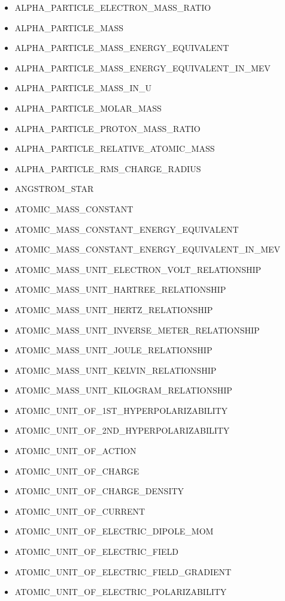 \begin{itemize}
\item
  ALPHA\_PARTICLE\_ELECTRON\_MASS\_RATIO
\item
  ALPHA\_PARTICLE\_MASS
\item
  ALPHA\_PARTICLE\_MASS\_ENERGY\_EQUIVALENT
\item
  ALPHA\_PARTICLE\_MASS\_ENERGY\_EQUIVALENT\_IN\_MEV
\item
  ALPHA\_PARTICLE\_MASS\_IN\_U
\item
  ALPHA\_PARTICLE\_MOLAR\_MASS
\item
  ALPHA\_PARTICLE\_PROTON\_MASS\_RATIO
\item
  ALPHA\_PARTICLE\_RELATIVE\_ATOMIC\_MASS
\item
  ALPHA\_PARTICLE\_RMS\_CHARGE\_RADIUS
\item
  ANGSTROM\_STAR
\item
  ATOMIC\_MASS\_CONSTANT
\item
  ATOMIC\_MASS\_CONSTANT\_ENERGY\_EQUIVALENT
\item
  ATOMIC\_MASS\_CONSTANT\_ENERGY\_EQUIVALENT\_IN\_MEV
\item
  ATOMIC\_MASS\_UNIT\_ELECTRON\_VOLT\_RELATIONSHIP
\item
  ATOMIC\_MASS\_UNIT\_HARTREE\_RELATIONSHIP
\item
  ATOMIC\_MASS\_UNIT\_HERTZ\_RELATIONSHIP
\item
  ATOMIC\_MASS\_UNIT\_INVERSE\_METER\_RELATIONSHIP
\item
  ATOMIC\_MASS\_UNIT\_JOULE\_RELATIONSHIP
\item
  ATOMIC\_MASS\_UNIT\_KELVIN\_RELATIONSHIP
\item
  ATOMIC\_MASS\_UNIT\_KILOGRAM\_RELATIONSHIP
\item
  ATOMIC\_UNIT\_OF\_1ST\_HYPERPOLARIZABILITY
\item
  ATOMIC\_UNIT\_OF\_2ND\_HYPERPOLARIZABILITY
\item
  ATOMIC\_UNIT\_OF\_ACTION
\item
  ATOMIC\_UNIT\_OF\_CHARGE
\item
  ATOMIC\_UNIT\_OF\_CHARGE\_DENSITY
\item
  ATOMIC\_UNIT\_OF\_CURRENT
\item
  ATOMIC\_UNIT\_OF\_ELECTRIC\_DIPOLE\_MOM
\item
  ATOMIC\_UNIT\_OF\_ELECTRIC\_FIELD
\item
  ATOMIC\_UNIT\_OF\_ELECTRIC\_FIELD\_GRADIENT
\item
  ATOMIC\_UNIT\_OF\_ELECTRIC\_POLARIZABILITY

\end{itemize}
